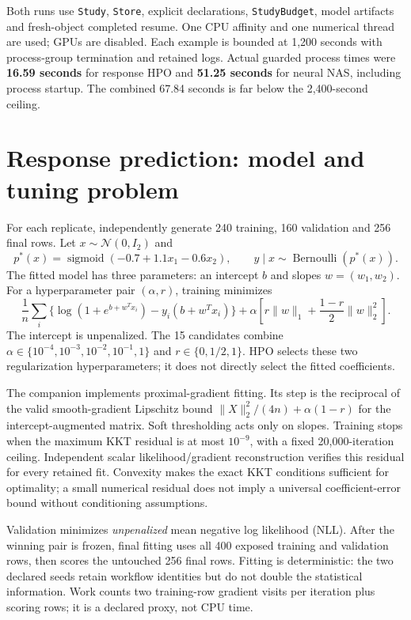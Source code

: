 Both runs use \texttt{Study}, \texttt{Store}, explicit declarations,
\texttt{StudyBudget}, model artifacts and fresh-object completed resume.
One CPU affinity and one numerical thread are used; GPUs are disabled. Each
example is bounded at 1,200 seconds with process-group termination and retained
logs. Actual guarded process times were \textbf{16.59 seconds} for response
HPO and \textbf{51.25 seconds} for neural NAS, including process startup.
The combined 67.84 seconds is far below the 2,400-second ceiling.

\section{Response prediction: model and tuning problem}

For each replicate, independently generate 240 training, 160 validation and
256 final rows. Let $x\sim\mathcal N(0,I_2)$ and
\[
 p^*(x)=\operatorname{sigmoid}(-0.7+1.1x_1-0.6x_2),\qquad
 y\mid x\sim\operatorname{Bernoulli}(p^*(x)).
\]
The fitted model has three parameters: an intercept $b$ and slopes
$w=(w_1,w_2)$. For a hyperparameter pair $(\alpha,r)$, training minimizes
\[
 \frac1n\sum_i\{\log(1+e^{b+w^Tx_i})-y_i(b+w^Tx_i)\}
 +\alpha\left[r\lVert w\rVert_1+
                  \frac{1-r}{2}\lVert w\rVert_2^2\right].
\]
The intercept is unpenalized. The 15 candidates combine
$\alpha\in\{10^{-4},10^{-3},10^{-2},10^{-1},1\}$ and
$r\in\{0,1/2,1\}$. HPO selects these two regularization hyperparameters;
it does not directly select the fitted coefficients.

The companion implements proximal-gradient fitting. Its step is the reciprocal
of the valid smooth-gradient Lipschitz bound
$\lVert X\rVert_2^2/(4n)+\alpha(1-r)$ for the intercept-augmented matrix.
Soft thresholding acts only on slopes. Training stops when the maximum KKT
residual is at most $10^{-9}$, with a fixed 20,000-iteration ceiling.
Independent scalar likelihood/gradient reconstruction verifies this residual
for every retained fit. Convexity makes the exact KKT conditions sufficient
for optimality; a small numerical residual does not imply a universal
coefficient-error bound without conditioning assumptions.

Validation minimizes \emph{unpenalized} mean negative log likelihood (NLL).
After the winning pair is frozen, final fitting uses all 400 exposed training
and validation rows, then scores the untouched 256 final rows. Fitting is
deterministic: the two declared seeds retain workflow identities but do not
double the statistical information. Work counts two training-row gradient
visits per iteration plus scoring rows; it is a declared proxy, not CPU time.

